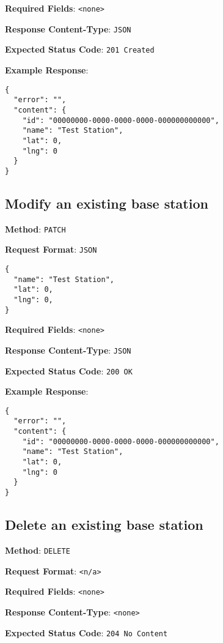 \noindent
\textbf{Required Fields}: \texttt{<none>}

\noindent
\textbf{Response Content-Type}: \texttt{JSON}

\noindent
\textbf{Expected Status Code}: \texttt{201 Created}

\noindent
\textbf{Example Response}:
\begin{verbatim}
{ 
  "error": "",
  "content": {
    "id": "00000000-0000-0000-0000-000000000000",
    "name": "Test Station",
    "lat": 0,
    "lng": 0
  }
}
\end{verbatim}


\subsection{Modify an existing base station}

\noindent
\textbf{Method}: \texttt{PATCH}

\noindent
\textbf{Request Format}: \texttt{JSON}
\begin{verbatim}
{ 
  "name": "Test Station",
  "lat": 0,
  "lng": 0,
}
\end{verbatim}

\noindent
\textbf{Required Fields}: \texttt{<none>}

\noindent
\textbf{Response Content-Type}: \texttt{JSON}

\noindent
\textbf{Expected Status Code}: \texttt{200 OK}

\noindent
\textbf{Example Response}:
\begin{verbatim}
{ 
  "error": "",
  "content": {
    "id": "00000000-0000-0000-0000-000000000000",
    "name": "Test Station",
    "lat": 0,
    "lng": 0
  }
}
\end{verbatim}


\subsection{Delete an existing base station}

\noindent
\textbf{Method}: \texttt{DELETE}

\noindent
\textbf{Request Format}: \texttt{<n/a>}

\noindent
\textbf{Required Fields}: \texttt{<none>}

\noindent
\textbf{Response Content-Type}: \texttt{<none>}

\noindent
\textbf{Expected Status Code}: \texttt{204 No Content}



